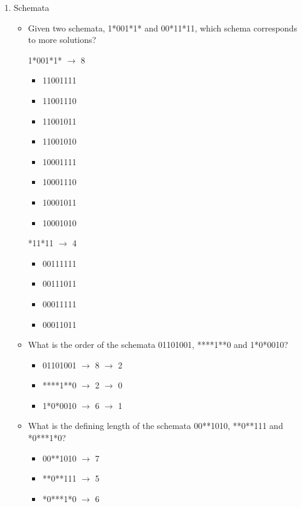 \documentclass{article}
\begin{document}
\begin{enumerate}
    \item Schemata
    \begin{itemize}
        \item Given two schemata, 1*001*1* and 00*11*11, which schema corresponds to more solutions?
        \begin{multicols}{2}
            1*001*1* $\rightarrow$ 8
            \begin{itemize}
                \item 11001111
                \item 11001110
                \item 11001011
                \item 11001010
                \item 10001111
                \item 10001110
                \item 10001011
                \item 10001010
            \end{itemize}
            *11*11 $\rightarrow$ 4
            \begin{itemize}
                \item 00111111
                \item 00111011
                \item 00011111
                \item 00011011
            \end{itemize}
        \end{multicols}
        \item What is the order of the schemata 01101001, ****1**0 and 1*0*0010?
        \begin{itemize}
            \item 01101001 $\rightarrow$ 8 $\rightarrow$ 2
            \item ****1**0 $\rightarrow$ 2 $\rightarrow$ 0
            \item 1*0*0010 $\rightarrow$ 6 $\rightarrow$ 1
        \end{itemize}
        \item What is the defining length of the schemata 00**1010, **0**111 and *0***1*0?
        \begin{itemize}
            \item 00**1010 $\rightarrow$ 7
            \item **0**111 $\rightarrow$ 5
            \item *0***1*0 $\rightarrow$ 6
        \end{itemize}


\end{itemize}
\end{enumerate}
\end{document}
